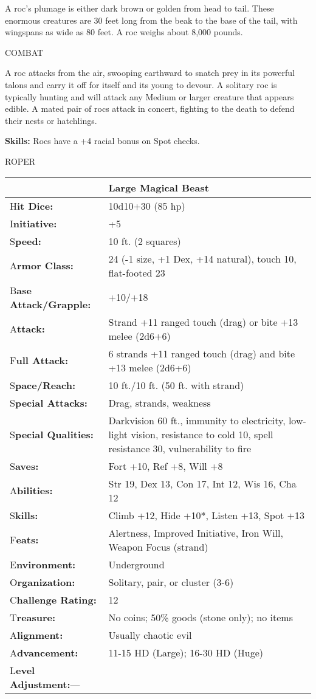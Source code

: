 \documentclass{article}
\begin{document}
A roc's plumage is either dark brown or golden from head to tail. These enormous 
creatures are 30 feet long from the beak to the base of the tail, with wingspans 
as wide as 80 feet. A roc weighs about 8,000 pounds.

COMBAT

A roc attacks from the air, swooping earthward to snatch prey in its powerful talons 
and carry it off for itself and its young to devour. A solitary roc is typically 
hunting and will attack any Medium or larger creature that appears edible. A mated 
pair of rocs attack in concert, fighting to the death to defend their nests or 
hatchlings.

\textbf{Skills:} Rocs have a +4 racial bonus on Spot checks.

\vspace{12pt}
{\LARGE{}ROPER}

\begin{tabular}{|>{\raggedright}p{84pt}|>{\raggedright}p{241pt}|}
\hline
  & Large Magical Beast\tabularnewline
\hline
H\textbf{it Dice:} & 10d10+30 (85 hp)\tabularnewline
\hline
I\textbf{nitiative:} & +5\tabularnewline
\hline
S\textbf{peed:} & 10 ft. (2 squares)\tabularnewline
\hline
A\textbf{rmor Class:} & 24 (-1 size, +1 Dex, +14 natural), touch 10, flat-footed 
23\tabularnewline
\hline
B\textbf{ase Attack/Grapple:} & +10/+18\tabularnewline
\hline
A\textbf{ttack:} & Strand +11 ranged touch (drag) or bite +13 melee (2d6+6)\tabularnewline
\hline
F\textbf{ull Attack:} & 6 strands +11 ranged touch (drag) and bite +13 melee (2d6+6)\tabularnewline
\hline
S\textbf{pace/Reach:} & 10 ft./10 ft. (50 ft. with strand)\tabularnewline
\hline
S\textbf{pecial Attacks:} & Drag, strands, weakness\tabularnewline
\hline
S\textbf{pecial Qualities:} & Darkvision 60 ft., immunity to electricity, low-light 
vision, resistance to cold 10, spell resistance 30, vulnerability to fire\tabularnewline
\hline
S\textbf{aves:} & Fort +10, Ref +8, Will +8\tabularnewline
\hline
A\textbf{bilities:} & Str 19, Dex 13, Con 17, Int 12, Wis 16, Cha 12\tabularnewline
\hline
S\textbf{kills:} & Climb +12, Hide +10*, Listen +13, Spot +13\tabularnewline
\hline
F\textbf{eats:} & Alertness, Improved Initiative, Iron Will, Weapon Focus (strand)\tabularnewline
\hline
E\textbf{nvironment:} & Underground\tabularnewline
\hline
O\textbf{rganization:} & Solitary, pair, or cluster (3-6)\tabularnewline
\hline
C\textbf{hallenge Rating:} & 12\tabularnewline
\hline
T\textbf{reasure:} & No coins; 50\% goods (stone only); no items\tabularnewline
\hline
A\textbf{lignment:} & Usually chaotic evil\tabularnewline
\hline
A\textbf{dvancement:} & 11-15 HD (Large); 16-30 HD (Huge)\tabularnewline
\hline
L\textbf{evel Adjustment:}--- & \tabularnewline
\hline
\end{tabular}
\end{document}
